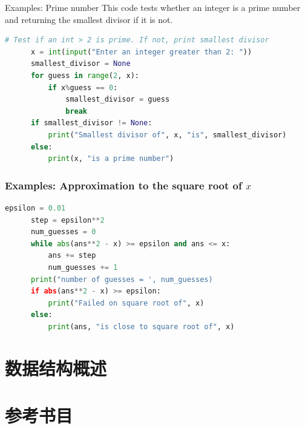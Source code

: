 \documentclass{sintefbeamer}
\begin{document}
\begin{frame}[fragile]{Examples: Prime number}
  This code tests whether an integer is a prime number and returning the smallest divisor if it is not.

  \begin{block}{}
    \begin{lstlisting}[language=Python]
      # Test if an int > 2 is prime. If not, print smallest divisor
      x = int(input("Enter an integer greater than 2: "))
      smallest_divisor = None
      for guess in range(2, x):
          if x%guess == 0:
              smallest_divisor = guess
              break
      if smallest_divisor != None:
          print("Smallest divisor of", x, "is", smallest_divisor)
      else:
          print(x, "is a prime number")
    \end{lstlisting}
  \end{block}
\end{frame}

\begin{frame}[fragile]
  \frametitle{Examples: Approximation to the square root of $x$}

  \begin{block}{}
    \begin{lstlisting}[language=Python]
      epsilon = 0.01
      step = epsilon**2
      num_guesses = 0
      while abs(ans**2 - x) >= epsilon and ans <= x:
          ans += step
          num_guesses += 1
      print("number of guesses = ', num_guesses)
      if abs(ans**2 - x) >= epsilon:
          print("Failed on square root of", x)
      else:
          print(ans, "is close to square root of", x)
    \end{lstlisting}
  \end{block}

\end{frame}

\section{数据结构概述}

\section{参考书目}

\backmatter
\end{document}
